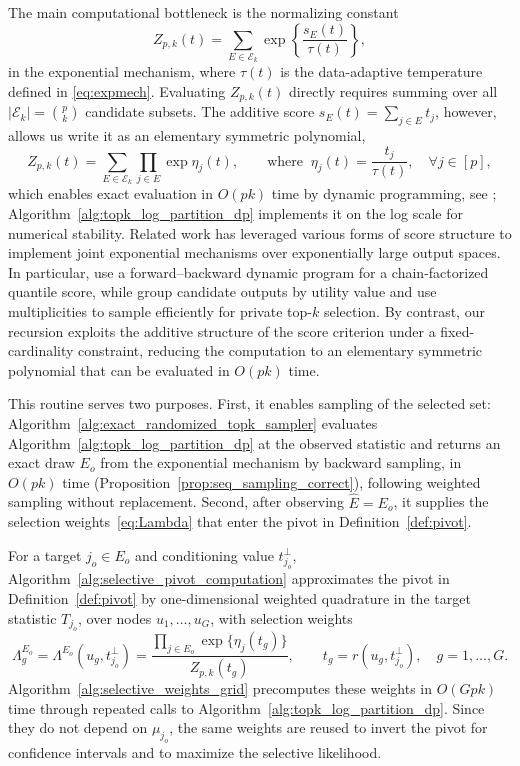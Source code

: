 \documentclass[12pt]{article}
\newcommand{\Ek}{\mathcal{E}_{k}}      %
\begin{document}
The main computational bottleneck is the normalizing constant
\[
  Z_{p,k}(t)
  =
  \sum_{E\in\mathcal E_k}
  \exp\left\{\frac{s_E(t)}{\tau(t)}\right\},
\]
in the exponential mechanism, where $\tau(t)$ is the data-adaptive temperature defined in \eqref{eq:expmech}.
Evaluating $Z_{p,k}(t)$ directly requires summing over all $|\Ek|=\binom{p}{k}$ candidate subsets.
The additive score $s_E(t)=\sum_{j\in E}t_j$, however, allows us write it as an elementary symmetric polynomial,
\[
  Z_{p,k}(t)
  =
  \sum_{E\in\mathcal E_k}
  \prod_{j\in E}\exp\eta_j(t),
  \qquad \text{where }\ \eta_j(t)=\frac{t_j}{\tau(t)},\quad \forall j\in [p],
\]
which enables exact evaluation in $O(pk)$ time by dynamic programming, see \cite{chen1997statistical}; Algorithm~\ref{alg:topk_log_partition_dp} implements it on the log scale for numerical stability.
Related work has leveraged various forms of score structure to implement joint exponential mechanisms over exponentially large output spaces. 
In particular, \citet{gillenwater2021differentially} use a forward--backward dynamic program for a chain-factorized quantile score, while \citet{gillenwater2022topk} group candidate outputs by utility value and use multiplicities to sample efficiently for private top-$k$ selection. 
By contrast, our recursion exploits the additive structure of the score criterion under a fixed-cardinality constraint, reducing the computation to an elementary symmetric polynomial that can be evaluated in $O(pk)$ time.

This routine serves two purposes.
First, it enables sampling of the selected set: Algorithm~\ref{alg:exact_randomized_topk_sampler} evaluates Algorithm~\ref{alg:topk_log_partition_dp} at the observed statistic and returns an exact draw $E_o$ from the exponential mechanism by backward sampling, in $O(pk)$ time (Proposition~\ref{prop:seq_sampling_correct}), following weighted sampling without replacement.
Second, after observing $\widehat E=E_o$, it supplies the selection weights~\eqref{eq:Lambda} that enter the pivot in Definition~\ref{def:pivot}.

For a target $j_o\in E_o$ and conditioning value $t_{j_o}^\perp$, Algorithm~\ref{alg:selective_pivot_computation} approximates the pivot in Definition~\ref{def:pivot} by one-dimensional weighted quadrature in the target statistic $T_{j_o}$, over nodes $u_1,\ldots,u_G$, with selection weights
\[
  \Lambda_g^{E_o}
  =
  \Lambda^{E_o}(u_g,t_{j_o}^\perp)
  =
  \frac{\prod_{j\in E_o}\exp\{\eta_j(t_g)\}}{Z_{p,k}(t_g)},
  \qquad t_g = r(u_g,t_{j_o}^\perp),\quad g=1,\ldots,G.
\]
Algorithm~\ref{alg:selective_weights_grid} precomputes these weights in $O(Gpk)$ time through repeated calls to Algorithm~\ref{alg:topk_log_partition_dp}.
Since they do not depend on $\mu_{j_o}$, the same weights are reused to invert the pivot for confidence intervals and to maximize the selective likelihood.
\end{document}

